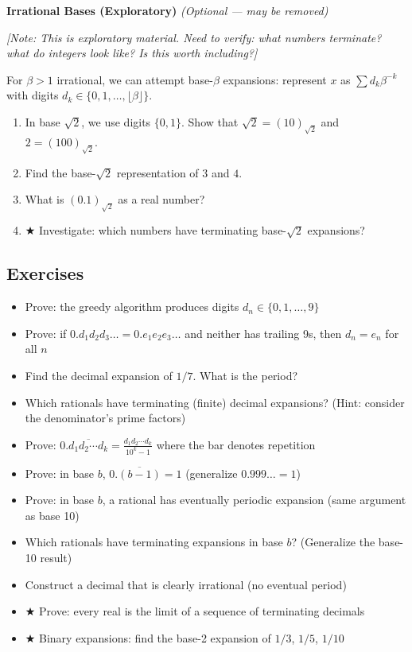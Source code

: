 \documentclass[
  10pt,
  letterpaper,
]{scrbook}
\providecommand{\tightlist}{%
  \setlength{\itemsep}{0pt}\setlength{\parskip}{0pt}}
\begin{document}
\textbf{Irrational Bases (Exploratory)} \emph{(Optional --- may be
removed)}

\emph{{[}Note: This is exploratory material. Need to verify: what
numbers terminate? what do integers look like? Is this worth
including?{]}}

For \(\beta > 1\) irrational, we can attempt base-\(\beta\) expansions:
represent \(x\) as \(\sum d_k \beta^{-k}\) with digits
\(d_k \in \{0, 1, \ldots, \lfloor \beta \rfloor\}\).

\begin{enumerate}
\def\labelenumi{(\alph{enumi})}
\item
  In base \(\sqrt{2}\), we use digits \(\{0, 1\}\). Show that
  \(\sqrt{2} = (10)_{\sqrt{2}}\) and \(2 = (100)_{\sqrt{2}}\).
\item
  Find the base-\(\sqrt{2}\) representation of \(3\) and \(4\).
\item
  What is \((0.1)_{\sqrt{2}}\) as a real number?
\item
  ★ Investigate: which numbers have terminating base-\(\sqrt{2}\)
  expansions?
\end{enumerate}

\subsection{Exercises}\label{exercises-9}

\begin{itemize}
\tightlist
\item
  Prove: the greedy algorithm produces digits
  \(d_n \in \{0, 1, \ldots, 9\}\)
\item
  Prove: if \(0.d_1d_2d_3\ldots = 0.e_1e_2e_3\ldots\) and neither has
  trailing 9s, then \(d_n = e_n\) for all \(n\)
\item
  Find the decimal expansion of \(1/7\). What is the period?
\item
  Which rationals have terminating (finite) decimal expansions? (Hint:
  consider the denominator's prime factors)
\item
  Prove:
  \(0.\overline{d_1 d_2 \cdots d_k} = \frac{d_1 d_2 \cdots d_k}{10^k - 1}\)
  where the bar denotes repetition
\item
  Prove: in base \(b\), \(0.\overline{(b-1)} = 1\) (generalize
  \(0.999\ldots = 1\))
\item
  Prove: in base \(b\), a rational has eventually periodic expansion
  (same argument as base 10)
\item
  Which rationals have terminating expansions in base \(b\)? (Generalize
  the base-10 result)
\item
  Construct a decimal that is clearly irrational (no eventual period)
\item
  ★ Prove: every real is the limit of a sequence of terminating decimals
\item
  ★ Binary expansions: find the base-2 expansion of \(1/3\), \(1/5\),
  \(1/10\)
\end{itemize}
\end{document}

